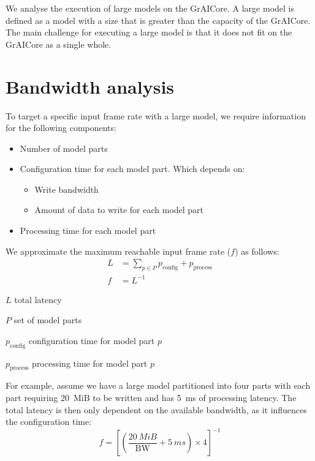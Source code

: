 We analyse the execution of large models on the GrAICore.
A large model is defined as a model with a size that is greater than the capacity of the GrAICore.
The main challenge for executing a large model is that it does not fit on the GrAICore as a single whole.

\section{Bandwidth analysis}
To target a specific input frame rate with a large model, we require information for the following components:
\begin{itemize}
    \item Number of model parts
    \item Configuration time for each model part. Which depends on:
    \begin{itemize}
        \item Write bandwidth
        \item Amount of data to write for each model part
    \end{itemize}
    \item Processing time for each model part
\end{itemize}

We approximate the maximum reachable input frame rate ($f$) as follows:
\begin{align*} 
    L &= \sum_{p \in P}^{}{p_{\textrm{config}} + p_{\textrm{process}}} \\
    f &= L^{-1}
\end{align*}

\begin{eqexpl}[15mm]
    \item{$L$} total latency
    \item{$P$} set of model parts
    \item{$p_{\textrm{config}}$} configuration time for model part $p$
    \item{$p_{\textrm{process}}$} processing time for model part $p$
\end{eqexpl}

For example, assume we have a large model partitioned into four parts with each part requiring \SI{20}{MiB} to be written and has \SI{5}{ms} of processing latency.
The total latency is then only dependent on the available bandwidth, as it influences the configuration time:
\begin{equation*}
    f = \left[ \left( \frac{\SI{20}{MiB}}{\textrm{BW}} + \SI{5}{ms} \right) \times 4 \right]^{-1}
\end{equation*}

